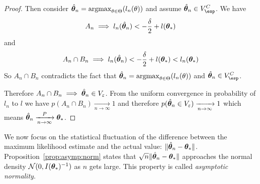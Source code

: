 \begin{proof}
  Then consider $\hat{\boldsymbol{\theta}}_n = \operatorname*{argmax}_{\theta \in
    \Theta}(l_n(\theta))$ and assume $\hat{\thetab}_n \in V_{\esp}^C$.
  We have
  \begin{align}
  A_n
    \implies l_n(\hat{\boldsymbol{\theta}}_n) < -\frac{\delta}{2} + l(\boldsymbol{\theta}_*)
  \end{align}
  and 
  \begin{align}
    A_n \cap B_n \implies l_n(\hat{\boldsymbol{\theta}}_n) < -\frac{\delta}{2} + l(\boldsymbol{\theta}_*) < l_n(\boldsymbol{\theta}_*)
  \end{align}
  So $A_n \cap B_n$ contradicts the fact that $\hat{\boldsymbol{\theta}}_n = \operatorname*{argmax}_{\theta \in
    \Theta}(l_n(\theta))$ and $\hat{\thetab}_n \in V_{\esp}^C$.

  Therefore $A_n \cap B_n \implies \hat{\boldsymbol{\theta}}_n \in V_{\varepsilon} $.
  From the uniform convergence in probability of $l_n$ to $l$ we have
  $p(A_n \cap B_n) \xrightarrow[n \rightarrow \infty]{} 1$ and therefore
  $p(\hat{\boldsymbol{\theta}}_n \in V_{\varepsilon}) \xrightarrow[n \rightarrow \infty]{} 1$ which
  means $\hat{\boldsymbol{\theta}}_n \xrightarrow[n \rightarrow \infty]{P} \boldsymbol{\theta}_*$.
\end{proof}

We now focus on the statistical fluctuation of the difference between the
maximum likelihood estimate and the actual value: $\|\hat{\boldsymbol{\theta}}_n -
\boldsymbol{\theta}_*\|$. Proposition~\ref{prop:asymp:norm} states that
$\sqrt{n}\|\hat{\boldsymbol{\theta}}_n - \boldsymbol{\theta}_*\|$ approaches the normal density
$\mathcal{N}(0, I(\boldsymbol{\theta}_*)^{-1})$ as $n$ gets large. This property is called \emph{asymptotic normality}.

